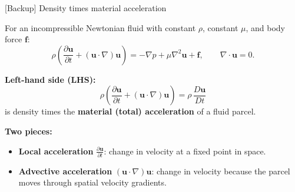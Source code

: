 \documentclass[aspectratio=169,11pt]{beamer}
\begin{document}
\begin{frame}{[Backup] Density times material acceleration}
\small

For an incompressible Newtonian fluid with constant $\rho$, constant $\mu$, and body force $\mathbf{f}$:
\[
\rho\left(\frac{\partial \mathbf{u}}{\partial t} + (\mathbf{u}\cdot\nabla)\mathbf{u}\right)
=
-\nabla p + \mu\nabla^2\mathbf{u} + \mathbf{f},
\qquad \nabla\cdot\mathbf{u}=0.
\]

\medskip
\textbf{Left-hand side (LHS):}
\[
\boxed{
\rho\left(\frac{\partial \mathbf{u}}{\partial t} + (\mathbf{u}\cdot\nabla)\mathbf{u}\right)
=
\rho\,\frac{D\mathbf{u}}{Dt}
}
\]
is density times the \textbf{material (total) acceleration} of a fluid parcel.

\medskip
\textbf{Two pieces:}
\begin{itemize}\itemsep3pt
\item \textbf{Local acceleration} $\displaystyle \frac{\partial \mathbf{u}}{\partial t}$:
change in velocity at a fixed point in space.
\item \textbf{Advective acceleration} $\displaystyle (\mathbf{u}\cdot\nabla)\mathbf{u}$:
change in velocity because the parcel moves through spatial velocity gradients.
\end{itemize}

\end{frame}
\end{document}
